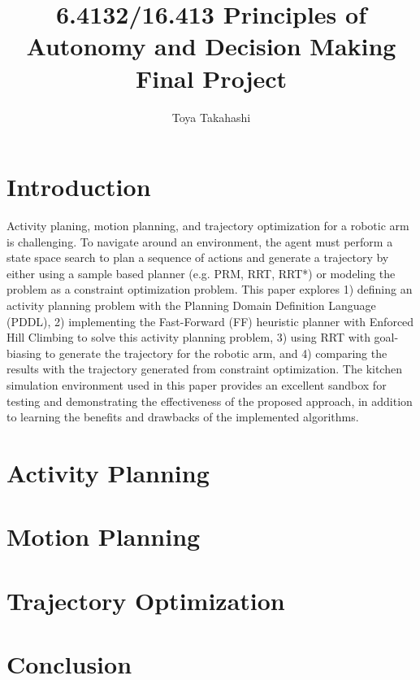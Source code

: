 \documentclass{article}
\title{6.4132/16.413 Principles of Autonomy and Decision Making Final Project}
\author[ ]{Toya Takahashi}
\affil[ ]{Massachusetts Institute of Technology}
\affil[ ]{Department of Aeronautics and Astronautics}
\begin{document}
\maketitle

\section{Introduction}

Activity planing, motion planning, and trajectory optimization for a robotic arm is challenging. To navigate around an environment, the agent must perform a state space search to plan a sequence of actions and generate a trajectory by either using a sample based planner (e.g. PRM, RRT, RRT*) or modeling the problem as a constraint optimization problem. This paper explores 1) defining an activity planning problem with the Planning Domain Definition Language (PDDL), 2) implementing the Fast-Forward (FF) heuristic planner with Enforced Hill Climbing to solve this activity planning problem, 3) using RRT with goal-biasing to generate the trajectory for the robotic arm, and 4) comparing the results with the trajectory generated from constraint optimization. The kitchen simulation environment used in this paper provides an excellent sandbox for testing and demonstrating the effectiveness of the proposed approach, in addition to learning the benefits and drawbacks of the implemented algorithms.

\section{Activity Planning}



\section{Motion Planning}



\section{Trajectory Optimization}



\cite{Cui1}



\section{Conclusion}

\printbibliography
\end{document}
